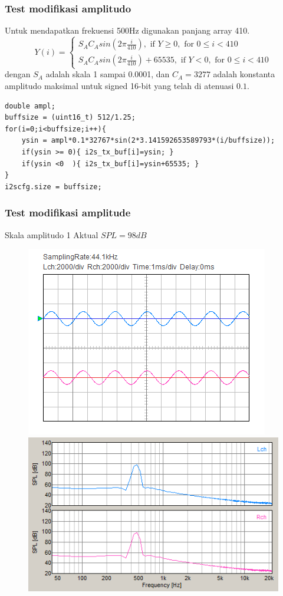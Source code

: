 \documentclass[table,dvipsnames,10pt]{beamer}
\begin{document}
	\begin{frame}[fragile]
	\frametitle{Test modifikasi amplitudo}
	\begin{exampleblock}{}
		Untuk mendapatkan frekuensi 500Hz digunakan panjang array 410.
		\[
		Y(i) =
		\begin{cases}
		S_A C_A sin(2 \pi \frac{i}{410}), \text{ if } Y \geq 0, \text{ for } 0 \leq i < 410\\
		S_A C_A sin(2 \pi \frac{i}{410})+65535, \text{ if } Y < 0, \text{ for } 0 \leq i < 410
		\end{cases}
		\]
		dengan $S_A$ adalah skala 1 sampai 0.0001, dan $C_A=3277$ adalah konstanta amplitudo maksimal
		untuk signed 16-bit yang telah di atenuasi $0.1$.
	\end{exampleblock}
	\begin{exampleblock}{}
		\begin{verbatim}
double ampl;
buffsize = (uint16_t) 512/1.25;
for(i=0;i<buffsize;i++){
	ysin = ampl*0.1*32767*sin(2*3.141592653589793*(i/buffsize));
	if(ysin >= 0){ i2s_tx_buf[i]=ysin; }
	if(ysin <0  ){ i2s_tx_buf[i]=ysin+65535; }
}
i2scfg.size = buffsize;
		\end{verbatim}
	\end{exampleblock}
	\end{frame}

	\begin{frame}[fragile]
	\frametitle{Test modifikasi amplitude}
	\begin{exampleblock}{Skala amplitudo 1}
		Aktual $SPL = 98 dB$
		\begin{figure}[H]
			\centering
			\includegraphics[width=0.4\linewidth]{result/day_4/500Hz/tone1}
			\includegraphics[width=0.45\linewidth]{result/day_4/500Hz/fft_tone1}
		\end{figure}
	\end{exampleblock}
	\end{frame}
\end{document}
